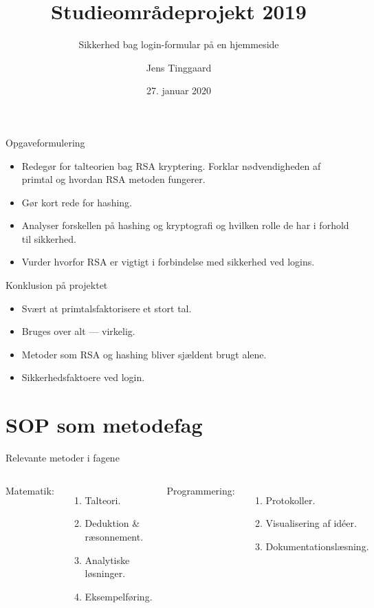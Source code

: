 \documentclass[10pt, aspectratio=169, usepdftitle=false]{beamer}
\title{Studieområdeprojekt 2019}
\subtitle{Sikkerhed bag login-formular på en hjemmeside}
\date{27. januar 2020}
\author{Jens Tinggaard}
\institute{Odense Tekniske Gymnasium}
\begin{document}
\maketitle


\begin{frame}{Opgaveformulering}
    \large
    \begin{itemize}
        \item Redegør for talteorien bag RSA kryptering. Forklar nødvendigheden af primtal og hvordan RSA metoden fungerer.
        \item Gør kort rede for hashing.
        \item Analyser forskellen på hashing og kryptografi og hvilken rolle de har i forhold til sikkerhed.
        \item Vurder hvorfor RSA er vigtigt i forbindelse med sikkerhed ved logins.
    \end{itemize}
\end{frame}

\begin{frame}{Konklusion på projektet}
    \large
    \begin{itemize}
        \item Svært at primtalsfaktorisere et stort tal.
        \item Bruges over alt --- virkelig.
        \item Metoder som RSA og hashing bliver sjældent brugt alene.
        \item Sikkerhedsfaktoere ved login.
    \end{itemize}
\end{frame}

\section{SOP som metodefag}

\begin{frame}{Relevante metoder i fagene}
    \large
    \begin{columns}[T,onlytextwidth]
            \alert{Matematik:}
            \begin{enumerate}
                \item Talteori.
                \item Deduktion \& ræsonnement.
                \item Analytiske løsninger.
                \item Eksempelføring.
            \end{enumerate}
            \alert{Programmering:}
            \begin{enumerate}
                \item Protokoller.
                \item Visualisering af id\'eer.
                \item Dokumentationslæsning.
            \end{enumerate}
    \end{columns}
\end{frame}
\end{document}
